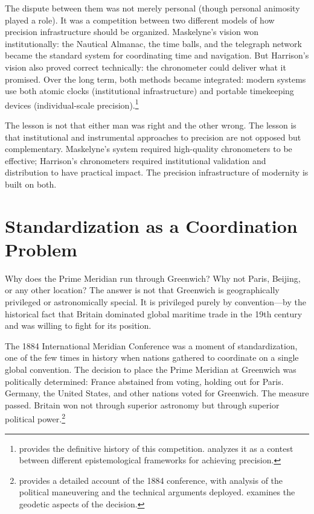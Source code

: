 The dispute between them was not merely personal (though personal animosity played a role). It was a competition between two different models of how precision infrastructure should be organized. Maskelyne's vision won institutionally: the Nautical Almanac, the time balls, and the telegraph network became the standard system for coordinating time and navigation. But Harrison's vision also proved correct technically: the chronometer could deliver what it promised. Over the long term, both methods became integrated: modern systems use both atomic clocks (institutional infrastructure) and portable timekeeping devices (individual-scale precision).\footnote{\textcite{Landes1983} provides the definitive history of this competition. \textcite{Galison2003} analyzes it as a contest between different epistemological frameworks for achieving precision.}

The lesson is not that either man was right and the other wrong. The lesson is that institutional and instrumental approaches to precision are not opposed but complementary. Maskelyne's system required high-quality chronometers to be effective; Harrison's chronometers required institutional validation and distribution to have practical impact. The precision infrastructure of modernity is built on both.

\section{Standardization as a Coordination Problem}

Why does the Prime Meridian run through Greenwich? Why not Paris, Beijing, or any other location? The answer is not that Greenwich is geographically privileged or astronomically special. It is privileged purely by convention---by the historical fact that Britain dominated global maritime trade in the 19th century and was willing to fight for its position.

The 1884 International Meridian Conference was a moment of standardization, one of the few times in history when nations gathered to coordinate on a single global convention. The decision to place the Prime Meridian at Greenwich was politically determined: France abstained from voting, holding out for Paris. Germany, the United States, and other nations voted for Greenwich. The measure passed. Britain won not through superior astronomy but through superior political power.\footnote{\textcite{Galison2003} provides a detailed account of the 1884 conference, with analysis of the political maneuvering and the technical arguments deployed. \textcite{Malys2015} examines the geodetic aspects of the decision.}

